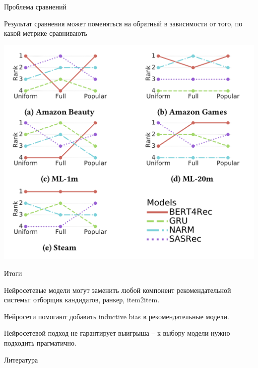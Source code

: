 \documentclass[11pt,aspectratio=169]{beamer}
\begin{document}
\begin{frame}{Проблема сравнений \cite{DALMANN}}

\begin{tcolorbox}[colback=warn!5,colframe=warn!80,title=]
Результат сравнения может поменяться на обратный в зависимости от того, по какой метрике сравнивають
\end{tcolorbox}

\begin{center}
\includegraphics[scale=0.25]{images/compare.png}
\end{center}

\end{frame}

\begin{frame}{Итоги}

\begin{tcolorbox}[colback=info!5,colframe=info!80,title=]
Нейросетевые модели могут заменить любой компонент рекомендательной системы: отборщик кандидатов, ранкер, item2item.
\end{tcolorbox}

\begin{tcolorbox}[colback=info!5,colframe=info!80,title=]
Нейросети помогают добавить inductive bias в рекомендательные модели.
\end{tcolorbox}

\begin{tcolorbox}[colback=warn!5,colframe=warn!80,title=]
Нейросетевой подход не гарантирует выигрыша -- к выбору модели нужно подходить прагматично.
\end{tcolorbox}

\end{frame}

\begin{frame}[allowframebreaks]{Литература}




\end{frame}
\end{document}
